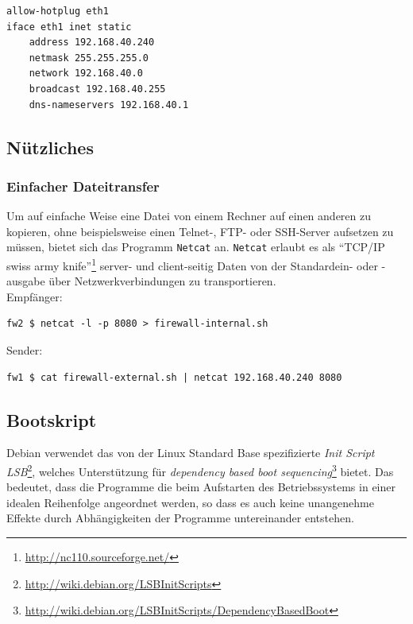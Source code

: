 \begin{lstlisting}[label=lst:fw2:eth1,caption={Netzwerkadapter eth1 Konfiguration.}]
allow-hotplug eth1
iface eth1 inet static
    address 192.168.40.240
    netmask 255.255.255.0
    network 192.168.40.0
    broadcast 192.168.40.255
    dns-nameservers 192.168.40.1
\end{lstlisting}


\subsection{Nützliches}

\subsubsection{Einfacher Dateitransfer}

Um auf einfache Weise eine Datei von einem Rechner auf einen anderen zu
kopieren, ohne beispielsweise einen Telnet-, FTP- oder SSH-Server aufsetzen zu
müssen, bietet sich das Programm {\tt Netcat} an.
{\tt Netcat} erlaubt es als "`TCP/IP swiss army knife"'\footnote{
\url{http://nc110.sourceforge.net/}
} server- und client-seitig Daten von der Standardein- oder -ausgabe über
Netzwerkverbindungen zu transportieren.\\

\noindent Empfänger:
\begin{verbatim}
fw2 $ netcat -l -p 8080 > firewall-internal.sh
\end{verbatim}

\noindent Sender:
\begin{verbatim}
fw1 $ cat firewall-external.sh | netcat 192.168.40.240 8080
\end{verbatim}


\subsection{Bootskript}

Debian verwendet das von der Linux Standard Base spezifizierte
\emph{Init Script LSB}\footnote{
\url{http://wiki.debian.org/LSBInitScripts}}, welches Unterstützung
für \emph{dependency based boot sequencing}\footnote{
\url{http://wiki.debian.org/LSBInitScripts/DependencyBasedBoot}
} bietet. Das bedeutet, dass
die Programme die beim Aufstarten des Betriebssystems in einer idealen
Reihenfolge angeordnet werden, so dass es auch keine unangenehme Effekte
durch Abhängigkeiten der Programme untereinander entstehen.


